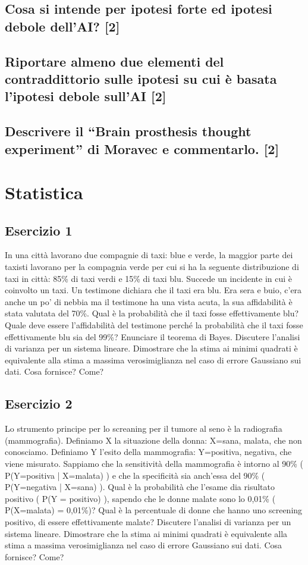 \documentclass[\main/main.tex]{subfiles}
\begin{document}
\subsection{Cosa si intende per ipotesi forte ed ipotesi debole dell'AI? [2]}
\subsection{Riportare almeno due elementi del contraddittorio sulle ipotesi su cui è basata l'ipotesi debole sull'AI [2]}
\subsection{Descrivere il “Brain prosthesis thought experiment” di Moravec e commentarlo. [2]}

\section{Statistica}

\subsection{Esercizio 1}
In una città lavorano due compagnie di taxi: blue e verde, la maggior parte dei taxisti lavorano per la compagnia verde per cui si ha la seguente distribuzione di taxi in città: 85\% di taxi verdi e 15\% di taxi blu. Succede un incidente in cui è coinvolto un taxi. Un testimone dichiara che il taxi era blu. Era sera e buio, c'era anche un po' di nebbia ma il testimone ha una vista acuta, la sua affidabilità è stata valutata del 70\%. Qual è la probabilità che il taxi fosse effettivamente blu? Quale deve essere l'affidabilità del testimone perché la probabilità che il taxi fosse effettivamente blu sia del 99\%? Enunciare il teorema di Bayes. Discutere l'analisi di varianza per un sistema lineare. Dimostrare che la stima ai minimi quadrati è equivalente alla stima a massima verosimiglianza nel caso di errore Gaussiano sui dati. Cosa fornisce? Come?

\subsection{Esercizio 2}
Lo strumento principe per lo screaning per il tumore al seno è la radiografia (mammografia). Definiamo X la situazione della donna: X={sana, malata}, che non conosciamo. Definiamo Y l'esito della mammografia: Y={positiva, negativa}, che viene misurato. Sappiamo che la sensitività della mammografia è intorno al 90\% ( P(Y=positiva | X=malata) ) e che la specificità sia anch'essa del 90\% ( P(Y=negativa | X=sana) ). Qual è la probabilità che l'esame dia risultato positivo ( P(Y = positivo) ), sapendo che le donne malate sono lo 0,01\% ( P(X=malata) = 0,01\%)? Qual è la percentuale di donne che hanno uno screening positivo, di essere effettivamente malate? Discutere l'analisi di varianza per un sistema lineare. Dimostrare che la stima ai minimi quadrati è equivalente alla stima a massima verosimiglianza nel caso di errore Gaussiano sui dati. Cosa fornisce? Come?
\end{document}
